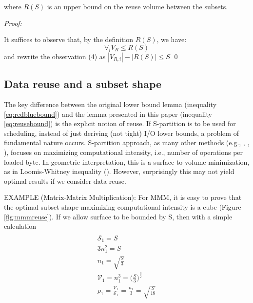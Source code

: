 \documentclass[sigconf]{acmart}
\begin{document}
where $R(S)$ is an upper bound on the reuse volume between the subsets.

\textit{Proof:}

It suffices to observe that, by the definition $R(S)$, we have:
$$\forall_{i} V_{R} \le R(S)$$
and rewrite the observation (4) as $|V_{R,i}| - |R(S)| \le S$ \qed


%	
%	
\subsection{Data reuse and a subset shape}
\label{sec:partitionShape}
The key difference between the original lower bound lemma (inequality 
\ref{eq:redbluebound}) and the lemma presented in this paper (inequality 
\ref{eq:reusebound}) is the explicit notion of reuse. 
If S-partition is to be used for scheduling, instead of just deriving 
(not tight) I/O lower bounds, a problem of fundamental nature occurs.
S-partition approach, as many other methods (e.g., \cite{IronyMMM}, 
\cite{MMM_LW}, \cite{elangoSymbolic}), focuses on maximizing computational 
intensity, 
i.e., number of operations per loaded byte. In geometric interpretation, 
this is a surface to volume minimization, as in Loomis-Whitney inequality 
(\cite{loomisWhitney}). However, surprisingly this may not yield optimal 
results if we 
consider data reuse.

EXAMPLE (Matrix-Matrix Multiplication): For MMM, it is easy to prove that 
the optimal subset shape maximizing computational intensity is a cube 
(Figure \ref{fig:mmmreuse}). If we allow surface to be bounded by S, 
then 
with a simple calculation	
\begin{multline}
\label{eq:cubic}
\\
\mathcal{S}_1 = S \\
3 n_1^2 = S \\
n_1 = \sqrt{\frac{S}{3}} \\
\mathcal{V}_1 = n_1^3 = \Big(\frac{S}{3}\Big)^{\frac{3}{2}} \\
\rho_1 = \frac{\mathcal{V}_1}{\mathcal{S}_1} = \frac{n_1}{3} = 
\sqrt{\frac{S}{18}}\\
\end{multline}
\end{document}
